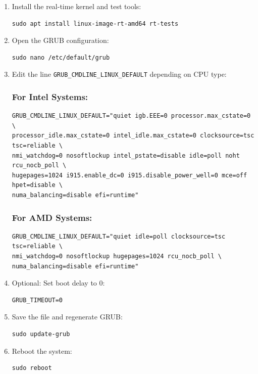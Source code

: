 \documentclass[a4paper,12pt]{article}
\begin{document}
\begin{enumerate}
\item Install the real-time kernel and test tools:
\begin{lstlisting}
sudo apt install linux-image-rt-amd64 rt-tests
\end{lstlisting}

\item Open the GRUB configuration:
\begin{lstlisting}
sudo nano /etc/default/grub
\end{lstlisting}

\item Edit the line \texttt{GRUB\_CMDLINE\_LINUX\_DEFAULT} depending on CPU type:

\subsubsection*{For Intel Systems:}
\begin{lstlisting}
GRUB_CMDLINE_LINUX_DEFAULT="quiet igb.EEE=0 processor.max_cstate=0 \
processor_idle.max_cstate=0 intel_idle.max_cstate=0 clocksource=tsc tsc=reliable \
nmi_watchdog=0 nosoftlockup intel_pstate=disable idle=poll noht rcu_nocb_poll \
hugepages=1024 i915.enable_dc=0 i915.disable_power_well=0 mce=off hpet=disable \
numa_balancing=disable efi=runtime"
\end{lstlisting}

\subsubsection*{For AMD Systems:}
\begin{lstlisting}
GRUB_CMDLINE_LINUX_DEFAULT="quiet idle=poll clocksource=tsc tsc=reliable \
nmi_watchdog=0 nosoftlockup hugepages=1024 rcu_nocb_poll \
numa_balancing=disable efi=runtime"
\end{lstlisting}

\item Optional: Set boot delay to 0:
\begin{lstlisting}
GRUB_TIMEOUT=0
\end{lstlisting}

\item Save the file and regenerate GRUB:
\begin{lstlisting}
sudo update-grub
\end{lstlisting}

\item Reboot the system:
\begin{lstlisting}
sudo reboot
\end{lstlisting}


\end{enumerate}
\end{document}
